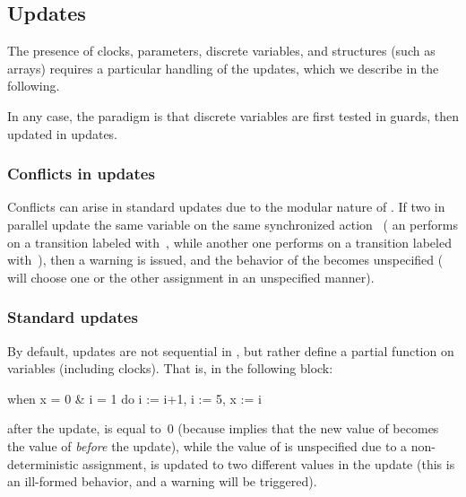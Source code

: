 \subsection{Updates}\label{ss:updates}

The presence of clocks, parameters, discrete variables, and structures (such as arrays) requires a particular handling of the updates, which we describe in the following.

In any case, the paradigm is that discrete variables are first tested in guards, then updated in updates.

\subsubsection{Conflicts in updates}

Conflicts can arise in standard updates due to the modular nature of \NIPTA{}.
If two \IPTA{} in parallel update the same variable on the same synchronized action~ (\eg{} an \IPTA{} performs  on a transition labeled with~, while another one performs  on a transition labeled with~), then a warning is issued, and the behavior of the \NIPTA{} becomes unspecified (\ie{} \imitator{} will choose one or the other assignment in an unspecified manner).

\subsubsection{Standard updates}\label{sss:standard-updates}

By default, updates are not sequential in \imitator{}, but rather define a partial function on variables (including clocks).
That is, in the following block:

\begin{IMITATORmodel}
	when x = 0 & i = 1 do {i := i+1, i := 5, x := i}
\end{IMITATORmodel}

\noindent{}after the update,  is equal to~0 (because  implies that the new value of  becomes the value of  \emph{before} the update), while the value of  is unspecified due to a non-deterministic assignment, \ie{}  is updated to two different values in the update (this is an ill-formed behavior, and a warning will be triggered).

